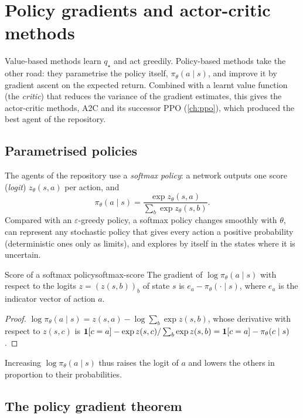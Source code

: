 \chapter{Policy gradients and actor-critic methods}
\label{ch:pg}

Value-based methods learn $q_\star$ and act greedily. Policy-based methods
take the other road: they parametrise the policy itself, $\pi_\theta(a \mid
s)$, and improve it by gradient ascent on the expected return. Combined
with a learnt value function (the \emph{critic}) that reduces the variance
of the gradient estimates, this gives the actor-critic methods, A2C and its
successor PPO (\cref{ch:ppo}), which produced the best agent of the
repository.

\section{Parametrised policies}

The agents of the repository use a \emph{softmax policy}: a network outputs
one score (\emph{logit}) $z_\theta(s, a)$ per action, and
\begin{equation}
  \pi_\theta(a \mid s) = \frac{\exp z_\theta(s, a)}{\sum_{b}
  \exp z_\theta(s, b)}.
\end{equation}
Compared with an $\varepsilon$-greedy policy, a softmax policy changes
smoothly with $\theta$, can represent any stochastic policy that gives every
action a positive probability (deterministic ones only as limits), and
explores
by itself in the states where it is uncertain.

\begin{proposition}{Score of a softmax policy}{softmax-score}
  The gradient of $\log \pi_\theta(a \mid s)$ with respect to the logits
  $z = (z(s, b))_b$ of state $s$ is $e_a - \pi_\theta(\cdot \mid s)$, where
  $e_a$ is the indicator vector of action $a$.
\end{proposition}

\begin{proof}
  $\log \pi_\theta(a \mid s) = z(s, a) - \log \sum_b \exp z(s, b)$, whose
  derivative with respect to $z(s, c)$ is $\mathbf{1}[c = a] - \exp z(s,
  c) / \sum_b \exp z(s, b) = \mathbf{1}[c = a] - \pi_\theta(c \mid s)$.
\end{proof}

Increasing $\log \pi_\theta(a \mid s)$ thus raises the logit of $a$ and
lowers the others in proportion to their probabilities.

\section{The policy gradient theorem}

